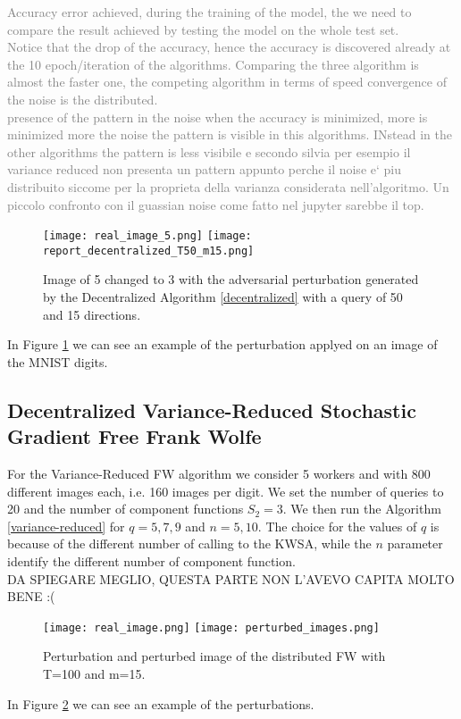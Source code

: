 \textcolor{gray}{Accuracy error achieved, during the training of the model, the we need to compare the result achieved by testing the model on the whole test set.\\ Notice that the drop of the accuracy, hence the accuracy is discovered already at the 10 epoch/iteration of the algorithms. Comparing the three algorithm is almost the faster one, the competing algorithm in terms of speed convergence of the noise is the distributed.
\\ presence of the pattern in the noise when the accuracy is minimized, more is minimized more the noise the pattern is visible in this algorithms. INstead in the other algorithms the pattern is less visibile e secondo silvia per esempio il variance reduced non presenta un pattern appunto perche il noise e` piu distribuito siccome per la proprieta della varianza considerata nell'algoritmo.
Un piccolo confronto con il guassian noise come fatto nel jupyter sarebbe il top.
}
\begin{figure}[htbp]
	\centering
	\texttt{[image: real\_image\_5.png]}\hfil
	\texttt{[image: report\_decentralized\_T50\_m15.png]}
	\caption{Image of 5 changed to 3 with the adversarial perturbation generated by the Decentralized Algorithm \ref{decentralized} with a query of 50 and 15 directions.}
	\label{fig:decentralized}
\end{figure}
In Figure \ref{fig:decentralized} we can see an example of the perturbation applyed on an image of the MNIST digits.

\subsection{Decentralized Variance-Reduced Stochastic Gradient Free Frank Wolfe}
For the Variance-Reduced FW algorithm we consider 5 workers and with 800 different images each, i.e. 160 images per digit. We set the number of queries to 20 and the number of component functions $S_2 = 3$. We then run the Algorithm \ref{variance-reduced} for $q=5,7,9$ and $n=5,10$. The choice for the values of $q$ is because of the different number of calling to the KWSA, while the $n$ parameter identify the different number of component function.\\

DA SPIEGARE MEGLIO, QUESTA PARTE NON L'AVEVO CAPITA MOLTO BENE :(

\begin{figure}[htbp]
	\centering
	\texttt{[image: real\_image.png]}
	\texttt{[image: perturbed\_images.png]}
	\caption{Perturbation and perturbed image of the distributed FW with T=100 and m=15.}
	\label{fig:variance-reduced}
\end{figure}
In Figure \ref{fig:variance-reduced} we can see an example of the perturbations.


